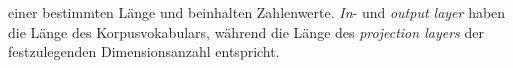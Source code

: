 einer bestimmten Länge und beinhalten Zahlenwerte. \emph{In}- und \emph{output layer} haben die Länge des Korpusvokabulars, während die Länge des \emph{projection layers} der festzulegenden Dimensionsanzahl entspricht.
%
%

